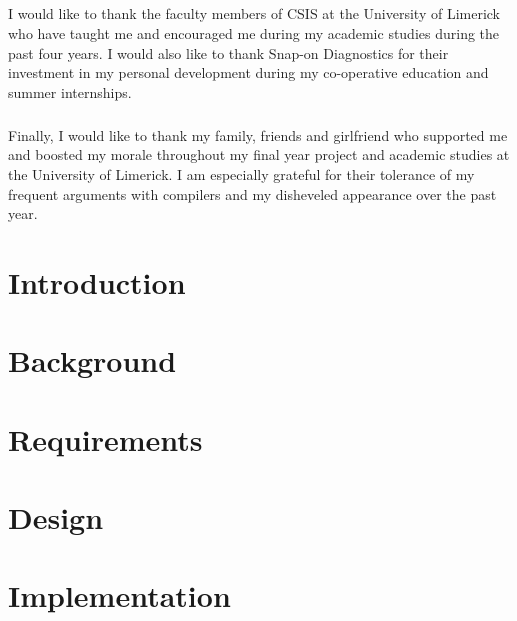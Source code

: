 \documentclass[12pt]{report}
\begin{document}
		\paragraph{}{
		I would like to thank the faculty members of CSIS at the University of Limerick who have taught me and encouraged me during my academic studies during the past four years. I would also like to thank Snap-on Diagnostics for their investment in my personal development during my co-operative education and summer internships.
		}		
		
		\paragraph{}{	
		Finally, I would like to thank my family, friends and girlfriend who supported me and boosted my morale throughout my final year project and academic studies at the University of Limerick. I am especially grateful for their tolerance of my frequent arguments with compilers and my disheveled appearance over the past year.
		}
		
	\tableofcontents
	\newpage	

	\chapter{Introduction}
		\setcounter{page}{1}
		\nocite{*}
		
	\newpage 
		
	\chapter{Background}
		
	\newpage

	\chapter{Requirements}
		
	\newpage	

	\chapter{Design}
		
	\newpage
	
	\chapter{Implementation}
		
	\newpage
\end{document}
